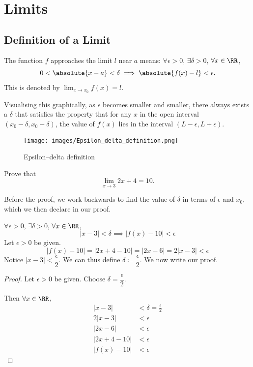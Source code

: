 \chapter{Limits}
\section{Definition of a Limit}
\begin{definition}[Limit]
The function $f$ approaches the limit $l$ near $a$ means: $\forall\epsilon>0$, $\exists\delta>0$, $\forall x\in\RR$,
\[0<\absolute{x-a}<\delta \implies\absolute{f(x)-l}<\epsilon.\]
This is denoted by $\displaystyle\lim_{x \to x_0}f(x)=l$.
\end{definition} 

Visualising this graphically, as $\epsilon$ becomes smaller and smaller, there always exists a $\delta$ that satisfies the property that for any $x$ in the open interval $(x_0-\delta,x_0+\delta)$, the value of $f(x)$ lies in the interval $(L-\epsilon, L+\epsilon)$.

\begin{figure}[H]
	\centering
	\texttt{[image: images/Epsilon\_delta\_definition.png]}
    \caption{Epsilon--delta definition}
\end{figure}

\begin{exercise} 
Prove that \[ \lim_{x\to3}2x+4=10. \]
\end{exercise}

Before the proof, we work backwards to find the value of $\delta$ in terms of $\epsilon$ and $x_0$, which we then declare in our proof.

$\forall \epsilon > 0$, $\exists \delta > 0$, $\forall x \in \RR$,
\[ |x-3| < \delta \implies |f(x)-10| < \epsilon \]
Let $\epsilon > 0$ be given.
\[ |f(x)-10| = |2x+4-10| = |2x-6| = 2|x-3| < \epsilon \]
Notice $|x-3| < \dfrac{\epsilon}{2}$. We can thus define $\delta \coloneqq \dfrac{\epsilon}{2}$. We now write our proof.

\begin{proof}
Let $\epsilon > 0$ be given. Choose $\delta = \dfrac{\epsilon}{2}$.

Then $\forall x \in \RR$, 
\begin{align*}
|x-3| &< \delta = \frac{\epsilon}{2} \\
2|x-3| &< \epsilon \\
|2x-6| &< \epsilon \\
|2x+4-10| &< \epsilon \\
|f(x)-10| &< \epsilon
\end{align*}
\end{proof}

